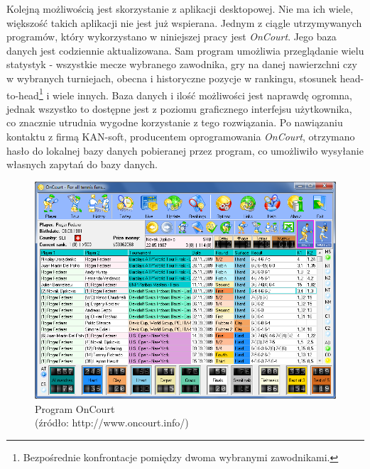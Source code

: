 Kolejną możliwością jest skorzystanie z aplikacji desktopowej. Nie ma ich wiele, większość takich aplikacji nie jest już wspierana. Jednym z ciągle utrzymywanych programów, który wykorzystano w niniejszej pracy jest \textit{OnCourt}. Jego baza danych jest codziennie aktualizowana. Sam program umożliwia przeglądanie wielu statystyk - wszystkie mecze wybranego zawodnika, gry na danej nawierzchni czy w wybranych turniejach, obecna i historyczne pozycje w rankingu, stosunek head-to-head\footnote{Bezpośrednie konfrontacje pomiędzy dwoma wybranymi zawodnikami.} i wiele innych. Baza danych i ilość możliwości jest naprawdę ogromna, jednak wszystko to dostępne jest z poziomu graficznego interfejsu użytkownika, co znacznie utrudnia wygodne korzystanie z tego rozwiązania. Po nawiązaniu kontaktu z firmą KAN-soft, producentem oprogramowania \textit{OnCourt}, otrzymano hasło do lokalnej bazy danych pobieranej przez program, co umożliwiło wysyłanie własnych zapytań do bazy danych. 

\begin{figure}
\includegraphics[width=\textwidth]{oncourt1.png}
\caption{Program OnCourt \\ (źródło: http://www.oncourt.info/)}
\label{fig:oncourt1}
\end{figure}

